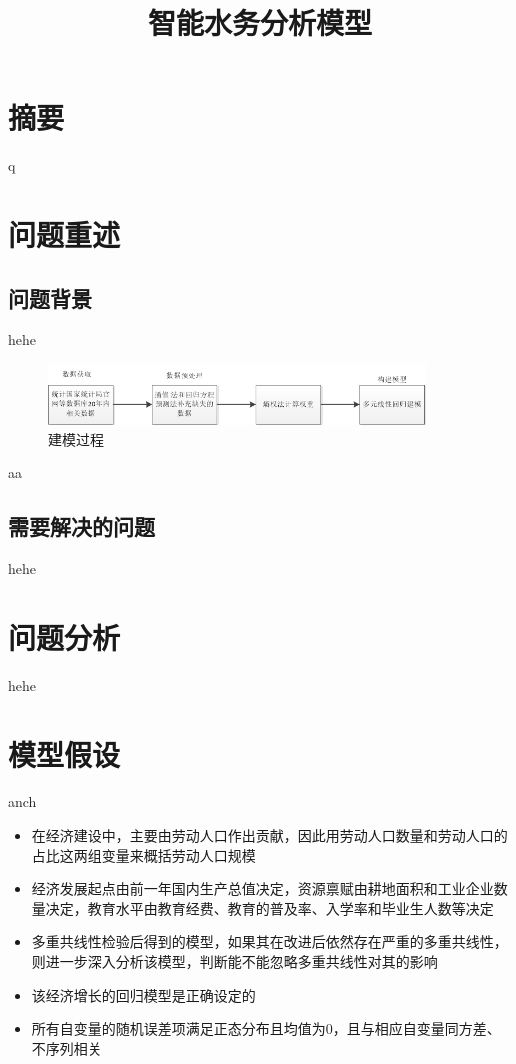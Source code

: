\documentclass{article}
\begin{document}
	\title{\vspace{+10pt} \heiti \textbf {智能水务分析模型}}
	\songti
	\author{}
	\date{}
	\maketitle  
	\section*{\centering \textbf{摘要}}
		q \cite{NBS}
		\newpage
	\section{问题重述}
		\subsection{问题背景}
			hehe \cite{kaldor1957model}
			\begin{figure}[htb]
			\centering
			\includegraphics[width=10cm]{pictures/jmgc.png}
			\caption{建模过程}
			\label{jmgc}
			\end{figure}	
		aa\cite{ywf2017eduandeco}
		\subsection{需要解决的问题}
			hehe \cite[text]{sqf}
	\section{问题分析}	
		hehe
	\section{模型假设}
		anch
	\begin{itemize}
		\item 在经济建设中，主要由劳动人口作出贡献，因此用劳动人口数量和劳动人口的占比这两组变量来概括劳动人口规模
		\item 经济发展起点由前一年国内生产总值决定，资源禀赋由耕地面积和工业企业数量决定，教育水平由教育经费、教育的普及率、入学率和毕业生人数等决定
		\item 多重共线性检验后得到的模型，如果其在改进后依然存在严重的多重共线性，则进一步深入分析该模型，判断能不能忽略多重共线性对其的影响
		\item 该经济增长的回归模型是正确设定的
		\item 所有自变量的随机误差项满足正态分布且均值为0，且与相应自变量同方差、不序列相关
	\end{itemize}
\end{document}
